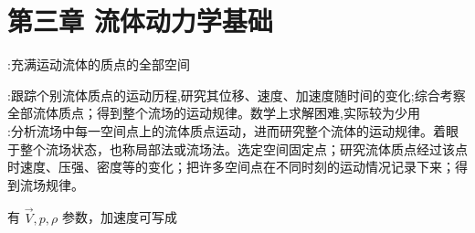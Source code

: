 \section{第三章 \quad 流体动力学基础}


:充满运动流体的质点的全部空间

:跟踪个别流体质点的运动历程,研究其位移、速度、加速度随时间的变化;综合考察全部流体质点；得到整个流场的运动规律。数学上求解困难,实际较为少用\\
:分析流场中每一空间点上的流体质点运动，进而研究整个流体的运动规律。着眼于整个流场状态，也称局部法或流场法。选定空间固定点；研究流体质点经过该点时速度、压强、密度等的变化；把许多空间点在不同时刻的运动情况记录下来；得到流场规律。

有 $\vec{V},p,\rho$ 参数，加速度可写成


